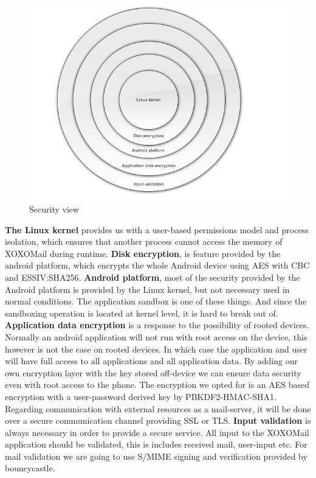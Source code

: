 \begin{figure}
	\includegraphics[width=\textwidth]{securityview.png}
	\caption{Security view}
	\label{fig:securityview}
\end{figure} \hfill
\newline
\newline
\textbf{The Linux kernel} provides us with a user-based permissions model and process isolation, which ensures that another process cannot access the memory of XOXOMail during runtime.
\newline
\newline
\textbf{Disk encryption}, is feature provided by the android platform, which encrypts the whole Android device using AES with CBC and ESSIV:SHA256.
\newline
\newline
\textbf{Android platform}, most of the security provided by the Android platform is provided by the Linux kernel, but not necessary used in normal conditions. The application sandbox is one of these things. And since the sandboxing operation is located at kernel level, it is hard to break out of. 
\newline
\newline
\textbf{Application data encryption} is a response to the possibility of rooted devices. Normally an android application will not run with root access on the device, this however is not the case on rooted devices. In which case the application and user will have full access to all applications and all application data. By adding our own encryption layer with the key stored off-device we can ensure data security even with root access to the phone. The encryption we opted for is an AES based encryption with a user-password derived key by PBKDF2-HMAC-SHA1.
Regarding communication with external resources as a mail-server, it will be done over a secure communication channel providing SSL or TLS. 
\newline
\newline
\textbf{Input validation} is always necessary in order to provide a secure service. All input to the XOXOMail application should be validated, this is includes received mail, user-input etc. For mail validation we are going to use S/MIME signing and verification provided by bouncycastle. 

